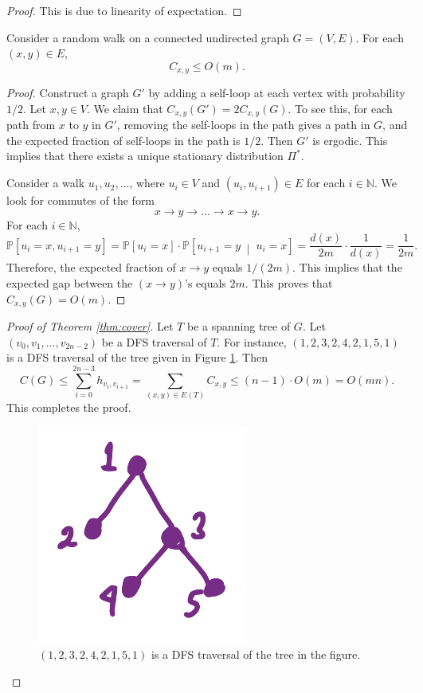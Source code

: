 \documentclass[letterpaper, reqno,11pt]{article}
\newcommand{\NN}{\mathbb{N}}
\newcommand{\PP}{\mathbb{P}}
\begin{document}
\begin{proof}
  This is due to linearity of expectation.
\end{proof}

\begin{lemma}
  Consider a random walk on a connected undirected graph $G = (V, E)$. For each $(x, y) \in E$,
  $$ C_{x, y} \leq O(m). $$
\end{lemma}

\begin{proof}
  Construct a graph $G'$ by adding a self-loop at each vertex with probability $1/2$. Let $x, y \in V$. We claim that $C_{x, y}(G') = 2C_{x, y}(G)$. To see this, for each path from $x$ to $y$ in $G'$, removing the self-loops in the path gives a path in $G$, and the expected fraction of self-loops in the path is $1/2$. Then $G'$ is ergodic. This implies that there exists a unique stationary distribution $\Pi^*$.

  Consider a walk $u_1, u_2, \ldots$, where $u_i \in V$ and $(u_i, u_{i + 1}) \in E$ for each $i \in \NN$. We look for commutes of the form
  $$ x \to y \to \ldots \to x \to y. $$
  For each $i \in \NN$,
  $$ \PP\left[u_i = x, u_{i + 1} = y\right] = \PP\left[u_i = x\right] \cdot \PP\left[u_{i + 1} = y \;\middle|\; u_i = x\right] = \frac{d(x)}{2m} \cdot \frac{1}{d(x)} = \frac{1}{2m}. $$
  Therefore, the expected fraction of $x \to y$ equals $1/(2m)$. This implies that the expected gap between the $(x \to y)$'s equals $2m$. This proves that $C_{x, y}(G) = O(m)$.
\end{proof}

\begin{proof}[Proof of Theorem \ref{thm:cover}]
  Let $T$ be a spanning tree of $G$. Let $(v_0, v_1, \ldots, v_{2n - 2})$ be a DFS traversal of $T$. For instance, $(1, 2, 3, 2, 4, 2, 1, 5, 1)$ is a DFS traversal of the tree given in Figure \ref{fig:dfs}. Then
  $$ C(G) \leq \sum_{i = 0}^{2n - 3} h_{v_i, v_{i + 1}} = \sum_{(x, y) \in E(T)} C_{x, y} \leq (n - 1) \cdot O(m) = O(mn). $$
  This completes the proof.

  \begin{figure}[h]
    \centering
    \includegraphics[width=.3\textwidth]{figures/dfs.png}
    \caption{$(1, 2, 3, 2, 4, 2, 1, 5, 1)$ is a DFS traversal of the tree in the figure.}
    \label{fig:dfs}
  \end{figure}
\end{proof}
\end{document}
